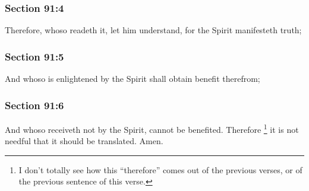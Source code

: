 	\subsubsection{Section 91:4} %
		\label{DC91-4}

		Therefore, whoso readeth it, let him understand, for the Spirit manifesteth truth;


	\subsubsection{Section 91:5} %
		\label{DC91-5}

		And whoso is enlightened by the Spirit shall obtain benefit therefrom;


	\subsubsection{Section 91:6} %
		\label{DC91-6}

		And whoso receiveth not by the Spirit, cannot be benefited. Therefore%
			\footnote{%
				I don't totally see how this ``therefore'' comes out of the previous verses, or of the previous sentence of this verse.
				}
		it is not needful that it should be translated. Amen.

